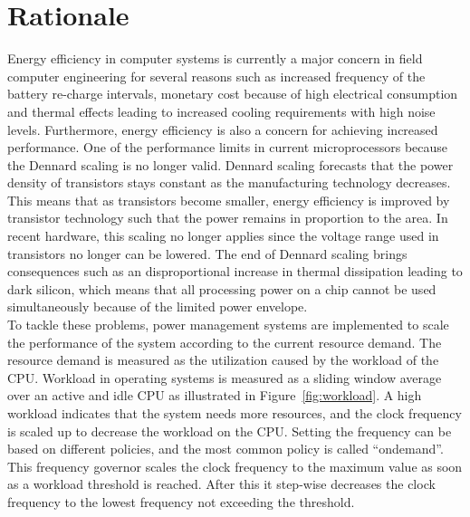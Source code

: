 \documentclass{article}
\begin{document}
\date{\today} %


\section{Rationale}
Energy efficiency in computer systems is currently a major concern in field computer engineering for several reasons such as increased frequency of the battery re-charge intervals, 
monetary cost because of high electrical consumption and thermal effects leading to increased cooling requirements with high noise levels. 
Furthermore, energy efficiency is also a concern for achieving increased performance.
One of the performance limits in current microprocessors because the Dennard scaling \cite{Dennard:74} is no longer valid. 
Dennard scaling forecasts that the power density of transistors stays constant as the manufacturing technology decreases. 
This means that as transistors become smaller, energy efficiency is improved by transistor technology such that the power remains in proportion to the area. 
In recent hardware, this scaling no longer applies since the voltage range used in transistors no longer can be lowered. 
The end of Dennard scaling brings consequences such as an disproportional increase in thermal dissipation leading to dark silicon, 
which means that all processing power on a chip cannot be used simultaneously because of the limited power envelope.\\

To tackle these problems, power management systems are implemented to scale the performance of the system according to the current resource demand. 
The resource demand is measured as the utilization caused by the workload of the CPU. 
Workload in operating systems is measured as a sliding window average over an active and idle CPU as illustrated in Figure~\ref{fig:workload}. 
A high workload indicates that the system needs more resources, and the clock frequency is scaled up to decrease the workload on the CPU.
Setting the frequency can be based on different policies, and the most common policy is called ``ondemand''\cite{ondemand}.
This frequency governor scales the clock frequency to the maximum value as soon as a workload threshold is reached.
After this it step-wise decreases the clock frequency to the lowest frequency not exceeding the threshold.\\
\end{document}

